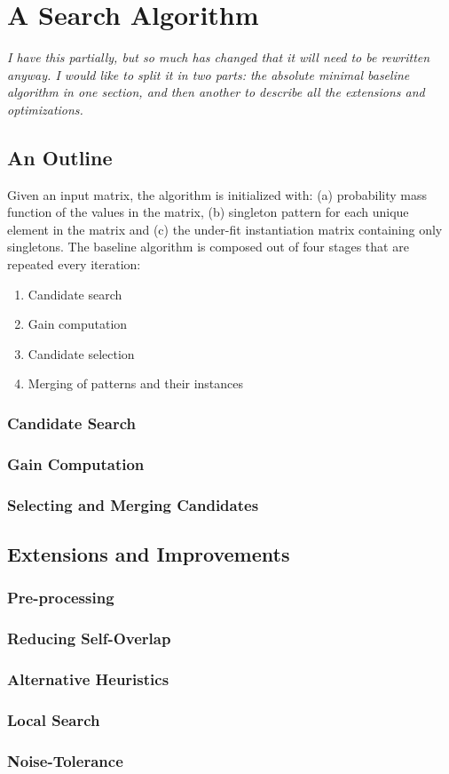 \documentclass[a4paper,notoc,oneside]{tufte-book}
\begin{document}
\chapter{A Search Algorithm}

\emph{I have this partially, but so much has changed that it will need to be rewritten anyway. I would like to split it in two parts: the absolute minimal baseline algorithm in one section, and then another to describe all the extensions and optimizations.}\\

\section{An Outline}

Given an input matrix, the algorithm is initialized with: (a) probability mass function of the values in the matrix, (b) singleton pattern for each unique element in the matrix and (c) the under-fit instantiation matrix containing only singletons.  The baseline algorithm is composed out of four stages that are repeated every iteration:
\begin{enumerate}
\item Candidate search
\item Gain computation
\item Candidate selection
\item Merging of patterns and their instances
\end{enumerate}

\subsection{Candidate Search}
\subsection{Gain Computation}
\subsection{Selecting and Merging Candidates}

\section{Extensions and Improvements}

\subsection{Pre-processing}
\subsection{Reducing Self-Overlap}
\subsection{Alternative Heuristics}
\subsection{Local Search}
\subsection{Noise-Tolerance}
\end{document}
